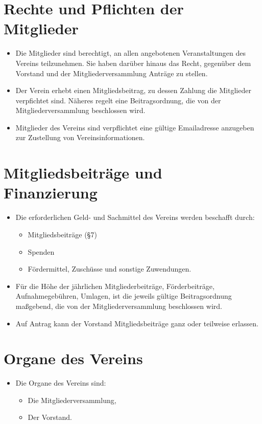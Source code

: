 \documentclass[a4paper,10pt]{article}
\begin{document}
\section{Rechte und Pflichten der Mitglieder}
  \begin{itemize}
   \item Die Mitglieder sind berechtigt, an allen angebotenen Veranstaltungen des Vereins teilzunehmen. Sie haben darüber hinaus das Recht, gegenüber dem Vorstand und der Mitgliederversammlung Anträge zu stellen. 
   \item Der Verein erhebt einen Mitgliedsbeitrag, zu dessen Zahlung die Mitglieder verpfichtet sind. Näheres regelt eine Beitragsordnung, die von der Mitgliederversammlung beschlossen wird.
   \item Mitglieder des Vereins sind verpflichtet eine gültige Emailadresse anzugeben zur Zustellung von Vereinsinformationen.
  \end{itemize}
  
\section{Mitgliedsbeiträge und Finanzierung}
  \begin{itemize}
   \item Die erforderlichen Geld- und Sachmittel des Vereins werden beschafft durch: 
   \begin{itemize}
    \item Mitgliedsbeiträge (§7) 
    \item Spenden
    \item Fördermittel, Zuschüsse und sonstige Zuwendungen. 
   \end{itemize}
   \item Für die Höhe der jährlichen Mitgliederbeiträge, Förderbeiträge, Aufnahmegebühren, Umlagen, ist die jeweils gültige Beitragsordnung maßgebend, die von der Mitgliederversammlung beschlossen wird.
   \item Auf Antrag kann der Vorstand Mitgliedsbeiträge ganz oder teilweise erlassen. 
  \end{itemize}


\section{Organe des Vereins}
  \begin{itemize}
   \item Die Organe des Vereins sind:
   \begin{itemize}
    \item Die Mitgliederversammlung,
    \item Der Vorstand.
   \end{itemize}
  \end{itemize}
\end{document}
